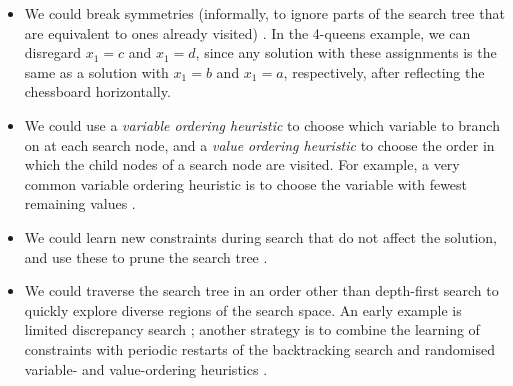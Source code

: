 \begin{itemize}
    \item We could break symmetries (informally, to ignore parts of the search tree
        that are equivalent to ones already visited) \citep{DBLP:reference/fai/GentPP06}.
	In the 4-queens example,
        we can disregard $x_1=c$ and $x_1=d$, since any solution with these assignments
        is the same as a solution with $x_1=b$ and $x_1=a$, respectively, after reflecting the chessboard
        horizontally.
    \item We could use a \emph{variable ordering heuristic} to choose which variable
    	to branch on at each search node, and a \emph{value ordering heuristic} to choose
	the order in which the child nodes of a search node are visited.
	For example, a very common variable ordering heuristic is to choose the variable
	with fewest remaining values \citep{golomb1965backtrack}.
    \item We could learn new constraints during search that do not affect the solution,
    	and use these to prune the search tree \citep{DBLP:conf/aaai/KatsirelosB05}.
    \item We could traverse the search tree in an order other than depth-first search
    	to quickly explore diverse regions of the search space.  An early
	example is limited discrepancy search \citep{DBLP:conf/ijcai/HarveyG95};
	another strategy is to combine the learning of constraints with periodic
	restarts of the backtracking search and randomised variable- and value-ordering
	heuristics
	\citep{DBLP:journals/jsat/LecoutreSTV07,DBLP:conf/cpaior/ArchibaldDHMP019}.
\end{itemize}

